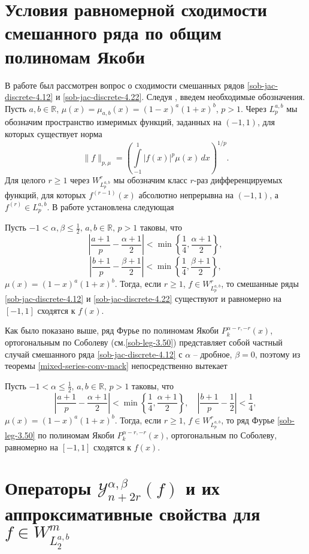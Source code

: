 \section{Условия равномерной сходимости смешанного ряда по общим полиномам Якоби}

В работе  \cite{sob-jac-discrete-Shar17} был рассмотрен вопрос  о сходимости смешанных рядов \eqref{sob-jac-discrete-4.12}  и \eqref{sob-jac-discrete-4.22}. Следуя \cite{sob-jac-discrete-Shar17},
 введем необходимые обозначения. Пусть $a,b\in\mathbb{R}$, $\mu(x)=\mu_{a,b}(x)=(1-x)^a(1+x)^b$,
$p>1$. Через $L^{a,b}_p$ мы обозначим пространство измеримых
функций, заданных на $(-1,1)$, для которых существует норма
$$ \|f\|_{p,\mu}=\left(\int\limits^1_{-1}|f(x)|^p\mu(x)\,dx\right)^{1/p}. $$
Для целого $r\ge1$ через $W^r_{L^{a,b}_p}$ мы обозначим класс
$r$-раз дифференцируемых функций, для которых $f^{(r-1)}(x)$
абсолютно непрерывна на $(-1,1)$, а $f^{(r)}\in L^{a,b}_p$. В работе \cite{Haar-Tcheb-Shar18} установлена следующая
\begin{theorem}\label{mixed-series-conv-mack}
 Пусть
$-1<\alpha,\beta\le\frac{1}{2},\,a,b\in\mathbb{R},\,p>1$ таковы, что
$$\left|\frac{a+1}{p}-\frac{\alpha+1}{2}\right|<
\min\left\{\frac{1}{4},\frac{\alpha+1}{2}\right\},$$$$
\left|\frac{b+1}{p}-\frac{\beta+1}{2}\right|<\min\left\{\frac{1}{4},\frac{\beta+1}{2}\right\},
$$  $\mu(x)=(1-x)^a(1+x)^b$. Тогда, если $r\ge1$,
$f\in W^r_{L^{a,b}_p}$, то смешанные ряды \eqref{sob-jac-discrete-4.12}  и \eqref{sob-jac-discrete-4.22} существуют
и равномерно на $[-1,1]$ сходятся к $f(x)$.
\end{theorem}
Как было показано выше, ряд Фурье  по полиномам Якоби $P_{k}^{\alpha-r,-r}(x)$, ортогональным по Соболеву (см.\eqref{sob-leg-3.50})  представляет собой частный случай смешанного ряда \eqref{sob-jac-discrete-4.12} с $\alpha$ -- дробное, $\beta=0$, поэтому из теоремы \ref{mixed-series-conv-mack} непосредственно вытекает
\begin{corollary}
  Пусть
$-1<\alpha\le\frac{1}{2},\,a,b\in\mathbb{R},\,p>1$ таковы, что
$$\left|\frac{a+1}{p}-\frac{\alpha+1}{2}\right|<
\min\left\{\frac{1}{4},\frac{\alpha+1}{2}\right\},\quad
\left|\frac{b+1}{p}-\frac{1}{2}\right|<\frac{1}{4},
$$
 $\mu(x)=(1-x)^a(1+x)^b$. Тогда, если $r\ge1$, $f\in W^r_{L^{a,b}_p}$, то  ряд Фурье \eqref{sob-leg-3.50} по полиномам Якоби $P_{k}^{\alpha-r,-r}(x)$, ортогональным по Соболеву,  равномерно на $[-1,1]$ сходятся к $f(x)$.
\end{corollary}

\section{ Операторы $\mathcal{Y}_{n+2r}^{\alpha, \beta}(f)$ и их аппроксимативные свойства для $f\in W^m_{L^{a,b}_2}$}

